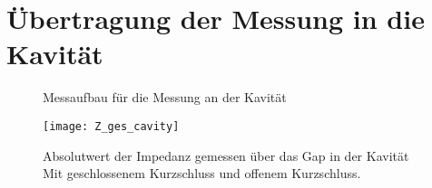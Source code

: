 \section{\"Ubertragung der Messung in die Kavit\"at}
\label{sec:kavitaetueber}
\begin{figure}[htb]
	\centering
	\hspace{0.1\textwidth}
	\caption{Messaufbau f\"ur die Messung an der Kavit\"at}
\end{figure}
\begin{figure}[t]
	\centering
	\texttt{[image: Z\_ges\_cavity]}
	\caption{Absolutwert der Impedanz gemessen \"uber das Gap in der Kavit\"at Mit geschlossenem Kurzschluss und offenem Kurzschluss.}
\end{figure}
